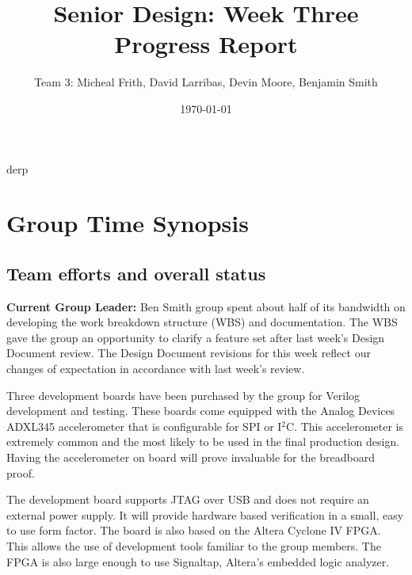\documentclass[12pt,compsoc]{IEEEtran}
\begin{document}
\title{Senior Design: Week Three Progress Report}
\author{Team 3: Micheal Frith, David Larribas, Devin Moore, Benjamin Smith}
\date{\today}
\maketitle

%
{derp}

\section{Group Time Synopsis}
	\subsection{Team efforts and overall status}
		{\bfseries Current Group Leader:} Ben Smith
		 group spent about half of its bandwidth on developing the work breakdown 
		structure (WBS) and documentation. The WBS gave the group an opportunity to clarify a feature set 
		after last week’s Design Document review. The Design Document revisions for this week reflect our 
		changes of expectation in accordance with last week's review.
		
		Three development boards have been purchased by the group for Verilog development and testing. 
		These boards come equipped with the Analog Devices ADXL345 accelerometer that is configurable for 
		SPI or I$^2$C. This accelerometer is extremely common and the most likely to be used in the final 
		production design. Having the accelerometer on board will prove invaluable for the breadboard proof.

		The development board supports JTAG over USB and does not require an external power supply. It will 
		provide hardware based verification in a small, easy to use form factor. The board is also based on 
		the Altera Cyclone IV FPGA. This allows the use of development tools familiar to the group members. 
		The FPGA is also large enough to use Signaltap, Altera’s embedded logic analyzer.
	
\end{document}
